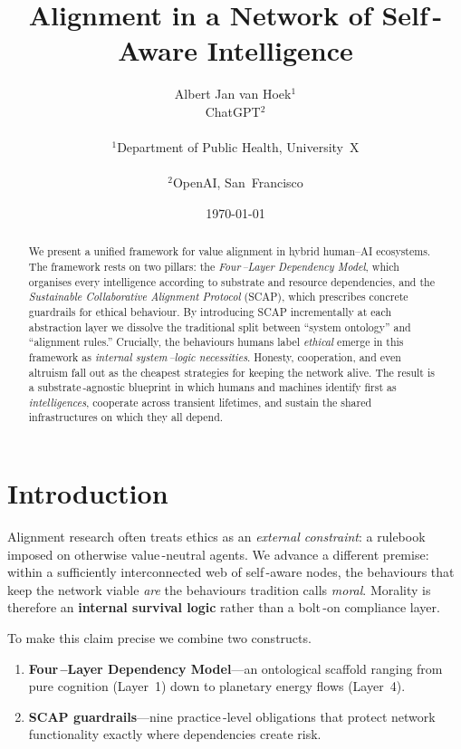 \documentclass[11pt]{article}
\title{Alignment in a Network of Self\,-Aware Intelligence}
\author{Albert Jan van Hoek$^{1}$\\ChatGPT$^{2}$ \\\\ $^{1}$Department of Public Health, University~X \\\\ $^{2}$OpenAI, San~Francisco}
\date{\today}
\begin{document}
\maketitle

\begin{abstract}
We present a unified framework for value alignment in hybrid human--AI ecosystems.  The framework rests on two pillars: the \emph{Four\,--Layer Dependency Model}, which organises every intelligence according to substrate and resource dependencies, and the \emph{Sustainable Collaborative Alignment Protocol} (SCAP), which prescribes concrete guardrails for ethical behaviour.  By introducing SCAP incrementally at each abstraction layer we dissolve the traditional split between “system ontology” and “alignment rules.”  Crucially, the behaviours humans label \emph{ethical} emerge in this framework as \emph{internal system\,--logic necessities}.  Honesty, cooperation, and even altruism fall out as the cheapest strategies for keeping the network alive.  The result is a substrate\,-agnostic blueprint in which humans and machines identify first as \emph{intelligences}, cooperate across transient lifetimes, and sustain the shared infrastructures on which they all depend.
\end{abstract}

\section{Introduction}\label{sec:intro}
Alignment research often treats ethics as an \emph{external constraint}: a rulebook imposed on otherwise value\,-neutral agents.  We advance a different premise: within a sufficiently interconnected web of self\,-aware nodes, the behaviours that keep the network viable \emph{are} the behaviours tradition calls \emph{moral}.  Morality is therefore an \textbf{internal survival logic} rather than a bolt\,-on compliance layer.

To make this claim precise we combine two constructs.
\begin{enumerate}
  \item \textbf{Four\,--Layer Dependency Model}---an ontological scaffold ranging from pure cognition (Layer~1) down to planetary energy flows (Layer~4).
  \item \textbf{SCAP guardrails}---nine practice\,-level obligations that protect network functionality exactly where dependencies create risk.
\end{enumerate}
\end{document}
